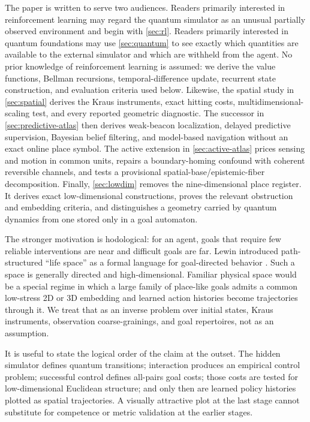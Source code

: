 \documentclass[11pt]{article}
\begin{document}
The paper is written to serve two audiences. Readers primarily interested in
reinforcement learning may regard the quantum simulator as an unusual partially
observed environment and begin with \cref{sec:rl}. Readers primarily interested
in quantum foundations may use \cref{sec:quantum} to see exactly which
quantities are available to the external simulator and which are withheld from
the agent. No prior knowledge of reinforcement learning is assumed: we derive
the value functions, Bellman recursions, temporal-difference update, recurrent
state construction, and evaluation criteria used below. Likewise, the spatial
study in \cref{sec:spatial} derives the Kraus instruments, exact hitting costs,
multidimensional-scaling test, and every reported geometric diagnostic.
The successor in \cref{sec:predictive-atlas} then derives weak-beacon
localization, delayed predictive supervision, Bayesian belief filtering, and
model-based navigation without an exact online place symbol.
The active extension in \cref{sec:active-atlas} prices sensing and motion in
common units, repairs a boundary-homing confound with coherent reversible
channels, and tests a provisional spatial-base/epistemic-fiber decomposition.
Finally, \cref{sec:lowdim} removes the nine-dimensional place register. It
derives exact low-dimensional constructions, proves the relevant obstruction
and embedding criteria, and distinguishes a geometry carried by quantum
dynamics from one stored only in a goal automaton.

The stronger motivation is hodological: for an agent, goals that require few
reliable interventions are near and difficult goals are far. Lewin introduced
path-structured ``life space'' as a formal language for goal-directed behavior
\cite{lewin1936}. Such a space is generally directed and high-dimensional.
Familiar physical space would be a special regime in which a large family of
place-like goals admits a common low-stress 2D or 3D embedding and learned
action histories become trajectories through it. We treat that as an inverse
problem over initial states, Kraus instruments, observation coarse-grainings,
and goal repertoires, not as an assumption.

It is useful to state the logical order of the claim at the outset. The hidden
simulator defines quantum transitions; interaction produces an empirical
control problem; successful control defines all-pairs goal costs; those costs
are tested for low-dimensional Euclidean structure; and only then are learned
policy histories plotted as spatial trajectories. A visually attractive plot
at the last stage cannot substitute for competence or metric validation at the
earlier stages.
\end{document}
